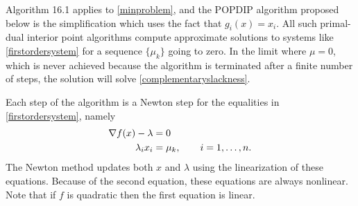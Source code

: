\documentclass[11pt]{article}
\newcommand{\grad}{\nabla}
\begin{document}
Algorithm 16.1 \cite{GrivaNashSofer2009} applies to \eqref{minproblem}, and the POPDIP algorithm proposed below is the simplification which uses the fact that $g_i(x)=x_i$.  All such primal-dual interior point algorithms compute approximate solutions to systems like \eqref{firstordersystem} for a sequence $\{\mu_k\}$ going to zero.  In the limit where $\mu=0$, which is never achieved because the algorithm is terminated after a finite number of steps, the solution will solve \eqref{complementaryslackness}.

Each step of the algorithm is a Newton step for the equalities in \eqref{firstordersystem}, namely
\begin{align}
\grad f(x) - \lambda &= 0 \label{equalitysystem} \\
\lambda_i x_i &= \mu_k, \qquad i=1,\dots,n. \notag
\end{align}
The Newton method updates both $x$ and $\lambda$ using the linearization of these equations.  Because of the second equation, these equations are always nonlinear.  Note that if $f$ is quadratic then the first equation is linear.
\end{document}
